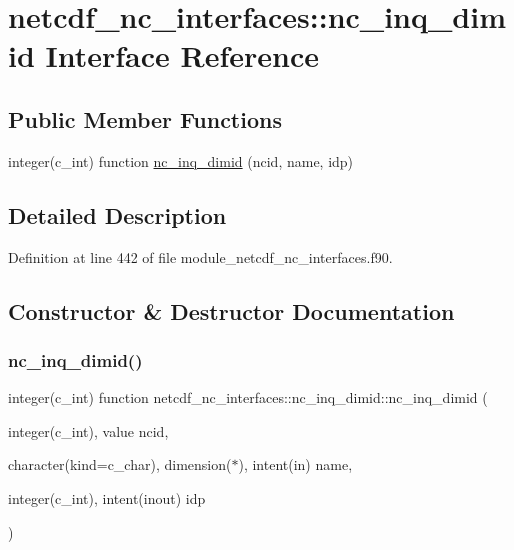 \hypertarget{interfacenetcdf__nc__interfaces_1_1nc__inq__dimid}{}\section{netcdf\+\_\+nc\+\_\+interfaces\+:\+:nc\+\_\+inq\+\_\+dimid Interface Reference}
\label{interfacenetcdf__nc__interfaces_1_1nc__inq__dimid}
\subsection*{Public Member Functions}
\begin{DoxyCompactItemize}
\item 
integer(c\+\_\+int) function \hyperlink{interfacenetcdf__nc__interfaces_1_1nc__inq__dimid_a2d1b9869abdc80b29e04dacc9edf2731}{nc\+\_\+inq\+\_\+dimid} (ncid, name, idp)
\end{DoxyCompactItemize}


\subsection{Detailed Description}


Definition at line 442 of file module\+\_\+netcdf\+\_\+nc\+\_\+interfaces.\+f90.



\subsection{Constructor \& Destructor Documentation}
\mbox{\label{interfacenetcdf__nc__interfaces_1_1nc__inq__dimid_a2d1b9869abdc80b29e04dacc9edf2731}} 
\subsubsection{\texorpdfstring{nc\+\_\+inq\+\_\+dimid()}{nc\_inq\_dimid()}}
{\footnotesize\ttfamily integer(c\+\_\+int) function netcdf\+\_\+nc\+\_\+interfaces\+::nc\+\_\+inq\+\_\+dimid\+::nc\+\_\+inq\+\_\+dimid (\begin{DoxyParamCaption}\item[{integer(c\+\_\+int), value}]{ncid,  }\item[{character(kind=c\+\_\+char), dimension($\ast$), intent(in)}]{name,  }\item[{integer(c\+\_\+int), intent(inout)}]{idp }\end{DoxyParamCaption})}



